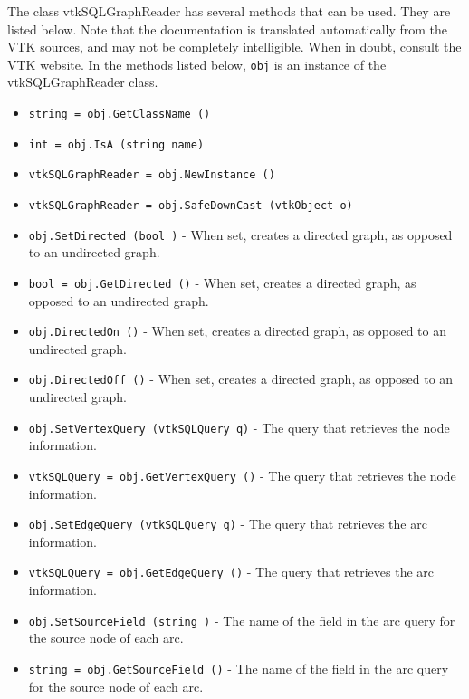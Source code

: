 The class vtkSQLGraphReader has several methods that can be used.
  They are listed below.
Note that the documentation is translated automatically from the VTK sources,
and may not be completely intelligible.  When in doubt, consult the VTK website.
In the methods listed below, \verb|obj| is an instance of the vtkSQLGraphReader class.
\begin{itemize}
\item  \verb|string = obj.GetClassName ()|

\item  \verb|int = obj.IsA (string name)|

\item  \verb|vtkSQLGraphReader = obj.NewInstance ()|

\item  \verb|vtkSQLGraphReader = obj.SafeDownCast (vtkObject o)|

\item  \verb|obj.SetDirected (bool )| -  When set, creates a directed graph, as opposed to an undirected graph.

\item  \verb|bool = obj.GetDirected ()| -  When set, creates a directed graph, as opposed to an undirected graph.

\item  \verb|obj.DirectedOn ()| -  When set, creates a directed graph, as opposed to an undirected graph.

\item  \verb|obj.DirectedOff ()| -  When set, creates a directed graph, as opposed to an undirected graph.

\item  \verb|obj.SetVertexQuery (vtkSQLQuery q)| -  The query that retrieves the node information.

\item  \verb|vtkSQLQuery = obj.GetVertexQuery ()| -  The query that retrieves the node information.

\item  \verb|obj.SetEdgeQuery (vtkSQLQuery q)| -  The query that retrieves the arc information.

\item  \verb|vtkSQLQuery = obj.GetEdgeQuery ()| -  The query that retrieves the arc information.

\item  \verb|obj.SetSourceField (string )| -  The name of the field in the arc query for the source node of each arc.

\item  \verb|string = obj.GetSourceField ()| -  The name of the field in the arc query for the source node of each arc.


\end{itemize}
